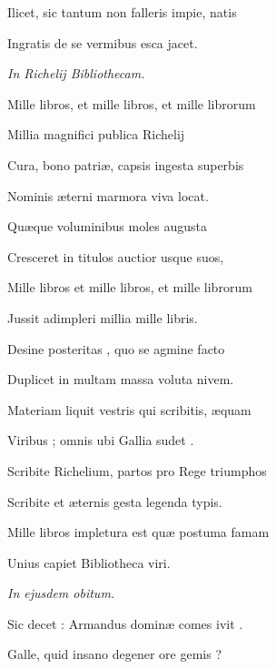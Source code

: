 \documentclass[11pt,a4paper]{article}
\begin{document}
Ilicet, sic tantum non falleris impie, natis

Ingratis de se vermibus esca jacet.

\emph{In Richelij Bibliothecam.}

Mille libros, et mille libros, et mille librorum

Millia magnifici publica Richelij

Cura, bono patriæ, capsis ingesta superbis

Nominis æterni marmora viva locat.

Quæque voluminibus moles augusta 

Cresceret in titulos auctior usque suos,

Mille libros et mille libros, et mille librorum

Jussit adimpleri millia mille libris.

Desine posteritas \ill{} \struck{\ill{}}, quo se agmine facto

Duplicet in multam massa voluta nivem.

Materiam liquit vestris qui scribitis, æquam

Viribus ; omnis ubi Gallia sudet .

Scribite Richelium, partos pro Rege triumphos

Scribite et æternis gesta legenda typis.

Mille libros impletura est quæ postuma famam

Unius capiet Bibliotheca viri.


\emph{In ejusdem obitum.}

Sic decet : Armandus dominæ comes ivit .

Galle, quid insano degener ore gemis ?
\end{document}
